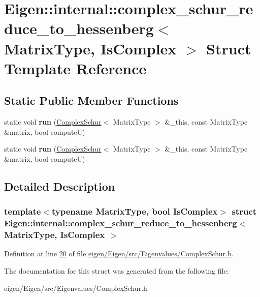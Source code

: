 \hypertarget{struct_eigen_1_1internal_1_1complex__schur__reduce__to__hessenberg}{}\section{Eigen\+:\+:internal\+:\+:complex\+\_\+schur\+\_\+reduce\+\_\+to\+\_\+hessenberg$<$ Matrix\+Type, Is\+Complex $>$ Struct Template Reference}
\label{struct_eigen_1_1internal_1_1complex__schur__reduce__to__hessenberg}
\subsection*{Static Public Member Functions}
\begin{DoxyCompactItemize}
\item 
\mbox{\label{struct_eigen_1_1internal_1_1complex__schur__reduce__to__hessenberg_a385fdf7234ee42f1d0d316ebfd142338}} 
static void {\bfseries run} (\hyperlink{group___eigenvalues___module_class_eigen_1_1_complex_schur}{Complex\+Schur}$<$ Matrix\+Type $>$ \&\+\_\+this, const Matrix\+Type \&matrix, bool computeU)
\item 
\mbox{\label{struct_eigen_1_1internal_1_1complex__schur__reduce__to__hessenberg_a385fdf7234ee42f1d0d316ebfd142338}} 
static void {\bfseries run} (\hyperlink{group___eigenvalues___module_class_eigen_1_1_complex_schur}{Complex\+Schur}$<$ Matrix\+Type $>$ \&\+\_\+this, const Matrix\+Type \&matrix, bool computeU)
\end{DoxyCompactItemize}


\subsection{Detailed Description}
\subsubsection*{template$<$typename Matrix\+Type, bool Is\+Complex$>$\newline
struct Eigen\+::internal\+::complex\+\_\+schur\+\_\+reduce\+\_\+to\+\_\+hessenberg$<$ Matrix\+Type, Is\+Complex $>$}



Definition at line \hyperlink{eigen_2_eigen_2src_2_eigenvalues_2_complex_schur_8h_source_l00020}{20} of file \hyperlink{eigen_2_eigen_2src_2_eigenvalues_2_complex_schur_8h_source}{eigen/\+Eigen/src/\+Eigenvalues/\+Complex\+Schur.\+h}.



The documentation for this struct was generated from the following file\+:\begin{DoxyCompactItemize}
\item 
eigen/\+Eigen/src/\+Eigenvalues/\+Complex\+Schur.\+h\end{DoxyCompactItemize}
